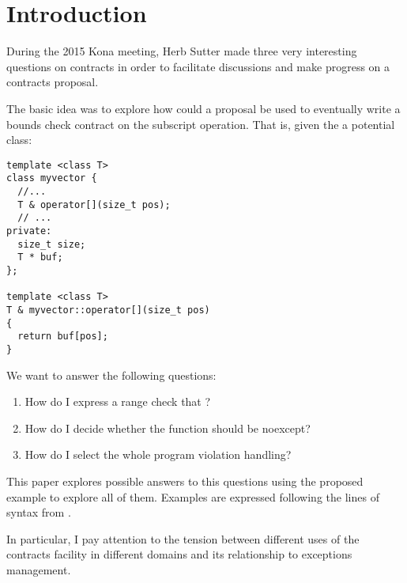 \section{Introduction}

During the 2015 Kona meeting, Herb Sutter made three very interesting questions
on contracts in order to facilitate discussions and make progress on a contracts
proposal.

The basic idea was to explore how could a proposal be used to eventually write a
bounds check contract on the subscript operation. That is, given the a potential
 class:

\begin{lstlisting}
template <class T>
class myvector {
  //...
  T & operator[](size_t pos);
  // ...
private:
  size_t size;
  T * buf;
};

template <class T>
T & myvector::operator[](size_t pos)
{
  return buf[pos];
}
\end{lstlisting}

We want to answer the following questions:

\begin{enumerate}
  \item How do I express a range check that  ?
  \item How do I decide whether the function should be noexcept?
  \item How do I select the whole program violation handling?
\end{enumerate}

This paper explores possible answers to this questions using the proposed
example to explore all of them. Examples are expressed following the lines
of syntax from \cite{n4415}.

In particular, I pay attention to the tension between different uses of the
contracts facility in different domains and its relationship to exceptions management.


